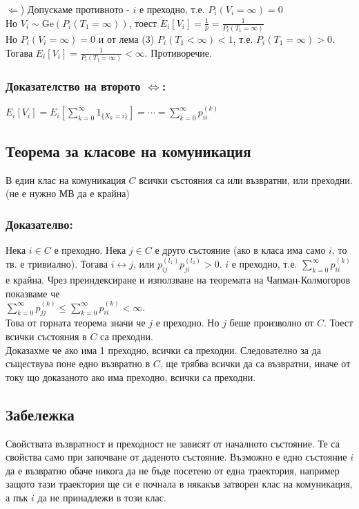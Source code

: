 \documentclass{article}
\begin{document}
$\Leftarrow$) Допускаме противното - $i$ е преходно, т.е. $P_i(V_i = \infty) = 0$ \\
Но $V_i \sim \mathrm{Ge}(P_i(T_1 = \infty))$, тоест $E_i[V_i] = \frac{1}{p} = \frac{1}{P_i(T_1 = \infty)}$ \\
Но $P_i(V_i = \infty) = 0$ и от лема (3) $P_i(T_1 < \infty) < 1$, т.е. $P_i(T_1 = \infty) > 0$. \\
Тогава $E_i[V_i] = \frac{1}{P_i(T_1 = \infty)} < \infty$. Противоречие.

\subsubsection*{Доказателство на второто $\Leftrightarrow$:}
$E_i[V_i] = E_i\left[\sum_{k=0}^\infty 1_{\{X_k = i\}}\right] = \cdots = \sum_{k=0}^\infty p_{ii}^{(k)}$

\subsection{Теорема за класове на комуникация}
В един клас на комуникация $C$ всички състояния са или възвратни, или преходни. (не е нужно МВ да е крайна)

\subsubsection*{Доказателво:}
Нека $i \in C$ е преходно. Нека $j \in C$ е друго състояние (ако в класа има само $i$, то тв. е тривиално). 
Тогава $i \leftrightarrow j$, или $p_{ij}^{(l_1)}p_{ji}^{(l_2)} > 0$. $i$ е преходно, т.е. $\sum_{k=0}^\infty p_{ii}^{(k)}$ е крайна. 
Чрез преиндексиране и използване на теоремата на Чапман-Колмогоров показваме че \\
$\sum_{k=0}^\infty p_{jj}^{(k)} \leq \sum_{k=0}^\infty p_{ii}^{(k)} < \infty$. \\ Това от горната теорема значи 
че $j$ е преходно. Но $j$ беше произволно от $C$. Тоест всички състояния в $C$ са преходни. \\
Доказахме че ако има 1 преходно, всички са преходни. Следователно за да съществува поне 
едно възвратно в $C$, ще трябва всички да са възвратни, иначе от току що доказаното 
ако има преходно, всички са преходни.

\subsection{Забележка}
Свойствата възвратност и преходност не зависят от началното състояние. 
Те са свойства само при започване от даденото състояние. Възможно е едно състояние $i$ да 
е възвратно обаче никога да не бъде посетено от една траектория, 
например защото тази траектория ще си е почнала в някакъв затворен клас на комуникация, 
а пък $i$ да не принадлежи в този клас.
\end{document}
